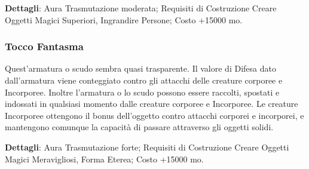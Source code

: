 \begin{multicols}{2}
\textbf{Dettagli}: Aura Trasmutazione moderata; Requisiti di Costruzione Creare Oggetti Magici Superiori, Ingrandire Persone; Costo +15000 mo.

\subsubsection{Tocco Fantasma}

Quest'armatura o scudo sembra quasi trasparente. Il valore di Difesa dato dall'armatura viene conteggiato contro gli attacchi delle creature corporee e Incorporee. Inoltre l'armatura o lo scudo possono essere raccolti, spostati e indossati in qualsiasi momento dalle creature corporee e Incorporee. Le creature Incorporee ottengono il bonus dell'oggetto contro attacchi corporei e incorporei, e mantengono comunque la capacità di passare attraverso gli oggetti solidi.

\textbf{Dettagli}: Aura Trasmutazione forte; Requisiti di Costruzione Creare Oggetti Magici Meravigliosi, Forma Eterea; Costo +15000 mo.
\end{multicols}